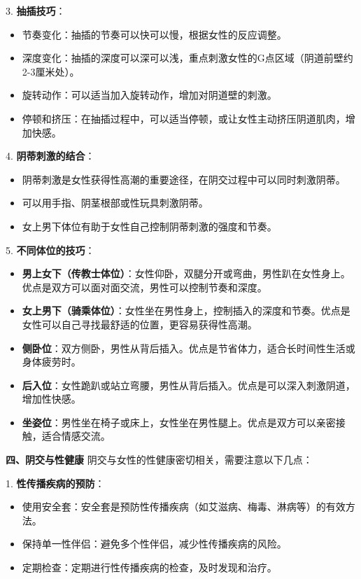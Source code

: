 \documentclass[12pt,UTF8]{ctexbook}
\begin{document}
3. \textbf{抽插技巧}：
\begin{itemize}
	\item 节奏变化：抽插的节奏可以快可以慢，根据女性的反应调整。
	\item 深度变化：抽插的深度可以深可以浅，重点刺激女性的G点区域（阴道前壁约2-3厘米处）。
	\item 旋转动作：可以适当加入旋转动作，增加对阴道壁的刺激。
	\item 停顿和挤压：在抽插过程中，可以适当停顿，或让女性主动挤压阴道肌肉，增加快感。
\end{itemize}

4. \textbf{阴蒂刺激的结合}：
\begin{itemize}
	\item 阴蒂刺激是女性获得性高潮的重要途径，在阴交过程中可以同时刺激阴蒂。
	\item 可以用手指、阴茎根部或性玩具刺激阴蒂。
	\item 女上男下体位有助于女性自己控制阴蒂刺激的强度和节奏。
\end{itemize}

5. \textbf{不同体位的技巧}：
\begin{itemize}
	\item \textbf{男上女下（传教士体位）}：女性仰卧，双腿分开或弯曲，男性趴在女性身上。优点是双方可以面对面交流，男性可以控制节奏和深度。
	\item \textbf{女上男下（骑乘体位）}：女性坐在男性身上，控制插入的深度和节奏。优点是女性可以自己寻找最舒适的位置，更容易获得性高潮。
	\item \textbf{侧卧位}：双方侧卧，男性从背后插入。优点是节省体力，适合长时间性生活或身体疲劳时。
	\item \textbf{后入位}：女性跪趴或站立弯腰，男性从背后插入。优点是可以深入刺激阴道，增加性快感。
	\item \textbf{坐姿位}：男性坐在椅子或床上，女性坐在男性腿上。优点是双方可以亲密接触，适合情感交流。
\end{itemize}

\textbf{四、阴交与性健康}
阴交与女性的性健康密切相关，需要注意以下几点：

1. \textbf{性传播疾病的预防}：
\begin{itemize}
	\item 使用安全套：安全套是预防性传播疾病（如艾滋病、梅毒、淋病等）的有效方法。
	\item 保持单一性伴侣：避免多个性伴侣，减少性传播疾病的风险。
	\item 定期检查：定期进行性传播疾病的检查，及时发现和治疗。
\end{itemize}
\end{document}
